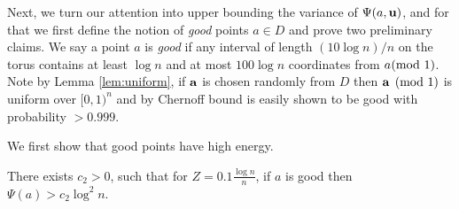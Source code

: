 Next, we turn our attention into upper bounding the variance of $\Psi(a,{\bf u})$, and
for that we first define the notion of {\em good} points $a\in D$ and prove two preliminary
claims.
We say a point $a$ is {\em good} if any interval of length $(10\log n)/n$
on the torus contains at least $\log n$ and at most $100 \log n$ coordinates from $a\hspace{-1ex}\pmod{1}$.
Note by Lemma \ref{lem:uniform}, if ${\bf a}$ is chosen randomly from $D$ then ${\bf a}\pmod{1}$ is uniform
over $[0,1)^n$ and by Chernoff bound is easily shown to be good with probability $>0.999$.

We first show that good points have high energy.
\begin{claim}\label{cl:6}
There exists $c_2>0$, such that for
$Z = 0.1 \frac{\log n}{n}$, if
$a$ is good then $\Psi(a)> c_2 \log^2 n$.
\end{claim}

